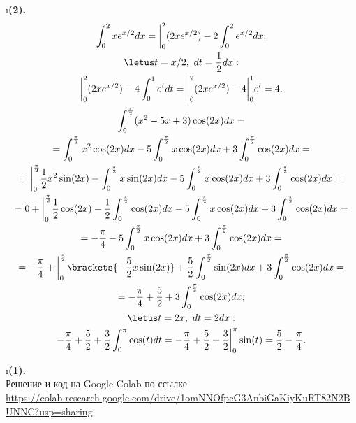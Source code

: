 \i \textbf{(2).}\\
\pu 
\begin{gather*}
    \int_0^2 xe^{x/2}dx = \bigg|_0^2 (2xe^{x/2}) - 2\int_0^2 e^{x/2}dx;\\
    \letus t = x/2,\ dt = \frac{1}{2}dx:\\
    \bigg|_0^2 (2xe^{x/2}) - 4\int_0^1 e^{t}dt = \bigg|_0^2 (2xe^{x/2}) - 4\bigg|_0^1 e^{t} = 4.
\end{gather*}
\pu
\begin{gather*}
    \int_0^{\frac{\pi}{2}} (x^2-5x+3)\cos(2x)dx = \\ = 
    \int_0^{\frac{\pi}{2}} x^2\cos(2x)dx - 5\int_0^{\frac{\pi}{2}} x\cos(2x)dx + 3\int_0^{\frac{\pi}{2}} \cos(2x)dx = \\ = 
    \bigg|_0^{\frac{\pi}{2}} \frac{1}{2}x^2\sin(2x) - \int_0^{\frac{\pi}{2}} x\sin(2x)dx  - 5\int_0^{\frac{\pi}{2}} x\cos(2x)dx + 3\int_0^{\frac{\pi}{2}} \cos(2x)dx = \\ = 
    0 + \bigg|_0^{\frac{\pi}{2}} \frac{1}{2}\cos(2x) - \frac{1}{2}\int_0^{\frac{\pi}{2}} \cos(2x)dx - 5\int_0^{\frac{\pi}{2}} x\cos(2x)dx + 3\int_0^{\frac{\pi}{2}} \cos(2x)dx = \\ =
    -\frac{\pi}{4} - 5\int_0^{\frac{\pi}{2}} x\cos(2x)dx + 3\int_0^{\frac{\pi}{2}} \cos(2x)dx = \\ = 
    -\frac{\pi}{4} + \bigg|_0^{\frac{\pi}{2}}\brackets{-\frac{5}{2}x\sin(2x)} + \frac{5}{2}\int_0^{\frac{\pi}{2}} \sin(2x)dx + 3\int_0^{\frac{\pi}{2}} \cos(2x)dx = \\ =
    -\frac{\pi}{4} + \frac{5}{2} + 3\int_0^{\frac{\pi}{2}} \cos(2x)dx;\\
    \letus t = 2x,\ dt = 2dx:\\
    -\frac{\pi}{4} + \frac{5}{2} + \frac{3}{2}\int_0^{\pi} \cos(t)dt =  -\frac{\pi}{4} + \frac{5}{2} + \frac{3}{2}\bigg|_0^{\pi} \sin(t) = \frac{5}{2} - \frac{\pi}{4}.
\end{gather*}

\i \textbf{(1).}\\
Решение и код на Google Colab по ссылке\\
\url{https://colab.research.google.com/drive/1omNNOfpcG3AnbiGaKiyKuRT82N2BUNNC?usp=sharing}
